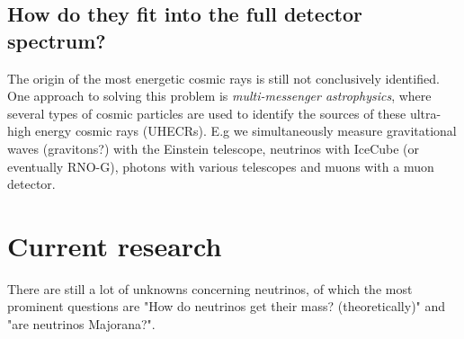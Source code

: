 \documentclass[11pt,a4paper,faculty=we,language=en,doctype=report]{cls/ugent-doc}
\begin{document}
\subsection{How do they fit into the full detector spectrum?}
The origin of the most energetic cosmic rays is still not conclusively
identified. One approach to solving this problem is \textit{multi-messenger
astrophysics}, where several types of cosmic particles are used to identify the
sources of these ultra-high energy cosmic rays (UHECRs). E.g we simultaneously
measure gravitational waves (gravitons?) with the Einstein telescope,
neutrinos with IceCube (or eventually RNO-G), photons with various telescopes
and muons with a muon detector.

\section{Current research}
There are still a lot of unknowns concerning neutrinos, of which the most prominent questions
are "How do neutrinos get their mass? (theoretically)" and "are neutrinos Majorana?".
\end{document}
